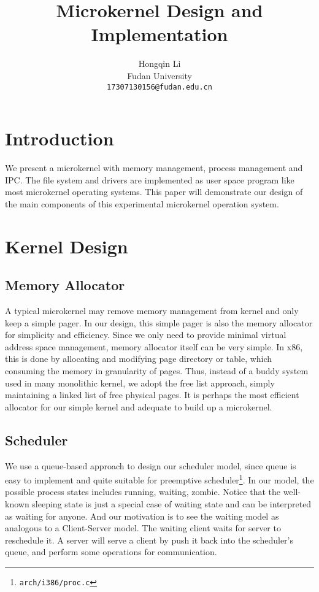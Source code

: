 \documentclass[11pt,a4paper]{article}
\title{Microkernel Design and Implementation}
\author{Hongqin Li\\
Fudan University\\
\texttt{17307130156@fudan.edu.cn}\\
}
\date{}
\begin{document}
\maketitle

\section{Introduction}
We present a microkernel with memory management, process management and IPC. The file system and drivers are implemented as user space program like most microkernel operating systems. This paper will demonstrate our design of the main components of this experimental microkernel operation system.

\section{Kernel Design}

\subsection{Memory Allocator}
A typical microkernel may remove memory management from kernel and only keep a simple pager. In our design, this simple pager is also the memory allocator for simplicity and efficiency. 
Since we only need to provide minimal virtual address space management, memory allocator itself can be very simple. In x86, this is done by allocating and modifying page directory or table, which consuming the memory in granularity of pages.
Thus, instead of a buddy system used in many monolithic kernel, we adopt the free list approach, simply maintaining a linked list of free physical pages. It is perhaps the most efficient allocator for our simple kernel and adequate to build up a microkernel.


\subsection{Scheduler}

We use a queue-based approach to design our scheduler model, since queue is easy to implement and quite suitable for preemptive scheduler\footnote{\texttt{arch/i386/proc.c}}. In our  model, the possible process states includes running, waiting, zombie. Notice that the well-known sleeping state is just a special case of waiting state and can be interpreted as waiting for anyone. And our motivation is to see the waiting model as analogous to a Client-Server model. The waiting client waits for server to reschedule it. A server will serve a client by push it back into the scheduler's queue, and perform some operations for communication. 
\end{document}
